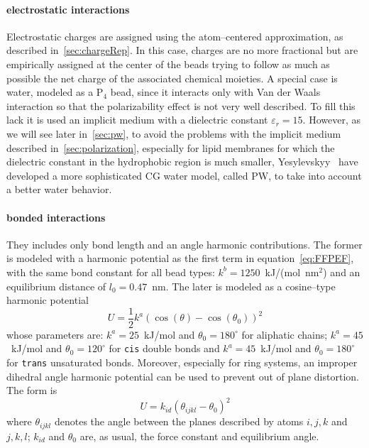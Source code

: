 \paragraph{\textbf{electrostatic interactions}} Electrostatic charges are assigned using the atom--centered approximation, as described in~\ref{sec:chargeRep}. In this case, charges are no more fractional but are empirically assigned at the center of the beads trying to follow as much as possible the net charge of the associated chemical moieties. A special case is water, modeled as a P$_4$ bead, since it interacts only with Van der Waals interaction so that the polarizability effect is not very well described. To fill this lack it is used an implicit medium with a dielectric constant $\varepsilon_r = 15$. However, as we will see later in~\ref{sec:pw}, to avoid the problems with the implicit medium described in~\ref{sec:polarization}, especially for lipid membranes for which the dielectric constant in the hydrophobic region is much smaller, Yesylevskyy \etal\, \cite{PW} have developed a more sophisticated \ac{CG} water model, called \ac{PW}, to take into account a better water behavior.

\paragraph{\textbf{bonded interactions}} They includes only bond length and an angle harmonic contributions. The former is modeled with a harmonic potential as the first term in equation~\eqref{eq:FFPEF}, with the same bond constant for all bead types: $k^b = 1250$~kJ/(mol\ nm$^2$) and an equilibrium distance of $l_0 = 0.47$~nm. The later is modeled as a cosine--type harmonic potential
\begin{equation*}
	U = \frac{1}{2}k^a (\cos(\theta) - \cos(\theta_0))^2
\end{equation*}
whose parameters are: $k^a = 25$~kJ/mol and $\theta_0 = 180^\circ$ for aliphatic chains; $k^a = 45$~kJ/mol and $\theta_0 = 120^\circ$ for \texttt{cis} double bonds and $k^a = 45$~kJ/mol and $\theta_0 = 180^\circ$ for \texttt{trans} unsaturated bonds. Moreover, especially for ring systems, an improper dihedral angle harmonic potential can be used to prevent out of plane distortion. The form is
\begin{equation*}
	U = k_{id} (\theta_{ijkl} - \theta_0)^2
\end{equation*}
where $\theta_{ijkl}$ denotes the angle between the planes described by atoms $i,j,k$ and $j,k,l$; $k_{id}$ and $\theta_0$ are, as usual, the force constant and equilibrium angle.


